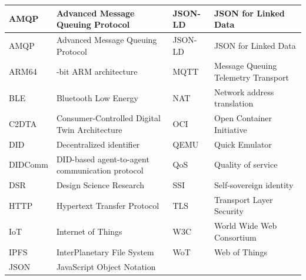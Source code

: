 \begingroup{}
\small{}
\begin{longtable}{@{}>{\RaggedRight\arraybackslash}p{}>{\RaggedRight\arraybackslash}p{}>{\RaggedRight\arraybackslash}p{}>{\RaggedRight\arraybackslash}p{}@{}}
\toprule
AMQP & Advanced Message Queuing Protocol & JSON-LD & JSON for Linked Data \\
\midrule\endfirsthead
\toprule
AMQP & Advanced Message Queuing Protocol & JSON-LD & JSON for Linked Data \\
\midrule\endhead
\bottomrule\endfoot
ARM64 & 64-bit ARM architecture & MQTT & Message Queuing Telemetry Transport \\
\addlinespace[3pt]
BLE & Bluetooth Low Energy & NAT & Network address translation \\
\addlinespace[3pt]
C2DTA & Consumer-Controlled Digital Twin Architecture & OCI & Open Container Initiative \\
\addlinespace[3pt]
DID & Decentralized identifier & QEMU & Quick Emulator \\
\addlinespace[3pt]
DIDComm & DID-based agent-to-agent communication protocol & QoS & Quality of service \\
\addlinespace[3pt]
DSR & Design Science Research & SSI & Self-sovereign identity \\
\addlinespace[3pt]
HTTP & Hypertext Transfer Protocol & TLS & Transport Layer Security \\
\addlinespace[3pt]
IoT & Internet of Things & W3C & World Wide Web Consortium \\
\addlinespace[3pt]
IPFS & InterPlanetary File System & WoT & Web of Things \\
\addlinespace[3pt]
JSON & JavaScript Object Notation &  &  \\
\end{longtable}
\endgroup
